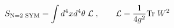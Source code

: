 \begin{equation}\label{SYMact}
  S_{\mbox{\scriptsize N=2 SYM}} =
\int d^4xd^4\theta\; {\cal L} \;, \qquad {\cal L} = \frac{1}{4g^2}  {\rm Tr}\;W^2  \end{equation} 
